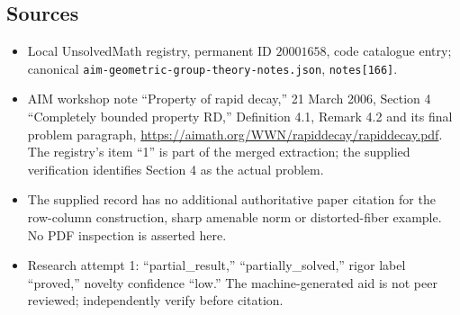 \documentclass[11pt]{article}
\begin{document}
\subsection{Sources}
\begin{itemize}
\item Local UnsolvedMath registry, permanent ID \(20001658\), code catalogue entry; canonical \texttt{aim-geometric-group-theory-notes.json}, \texttt{notes[166]}.
\item AIM workshop note ``Property of rapid decay,'' 21 March 2006, Section 4 ``Completely bounded property RD,'' Definition 4.1, Remark 4.2 and its final problem paragraph, \url{https://aimath.org/WWN/rapiddecay/rapiddecay.pdf}. The registry's item ``1'' is part of the merged extraction; the supplied verification identifies Section 4 as the actual problem.
\item The supplied record has no additional authoritative paper citation for the row-column construction, sharp amenable norm or distorted-fiber example. No PDF inspection is asserted here.
\item Research attempt 1: ``partial\_result,'' ``partially\_solved,'' rigor label ``proved,'' novelty confidence ``low.'' The machine-generated aid is not peer reviewed; independently verify before citation.
\end{itemize}
\end{document}
